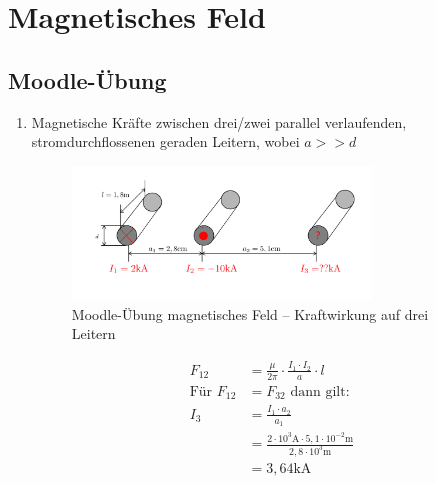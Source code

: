 \section{Magnetisches Feld}
\subsection{Moodle-Übung}
\begin{enumerate}
  \item Magnetische Kräfte zwischen drei/zwei parallel verlaufenden, stromdurchflossenen geraden Leitern, wobei $a >> d$
        \begin{figure}[h!]
          \begin{center}
            \includegraphics[width=0.75\textwidth]{img/Magnetisches-Feld/A1.png}
          \end{center}
          \caption{Moodle-Übung magnetisches Feld – Kraftwirkung auf drei Leitern}
        \end{figure}

        \begin{align*}
          F_{12}             & = \frac{\mu}{2\pi}\cdot \frac{I_1\cdot I_2}{a}\cdot l                                 \\
          \text{Für } F_{12} & = F_{32} \text{ dann gilt:}                                                           \\
          I_3                & = \frac{I_1\cdot a_2}{a_1}                                                            \\
                             & = \frac{2\cdot 10^{3}\text{A}\cdot 5,1\cdot 10^{-2}\text{m}}{2,8\cdot 10^{3}\text{m}} \\
                             & = 3,64\text{kA}                                                                       \\                                                                   \\
        \end{align*}


\end{enumerate}
